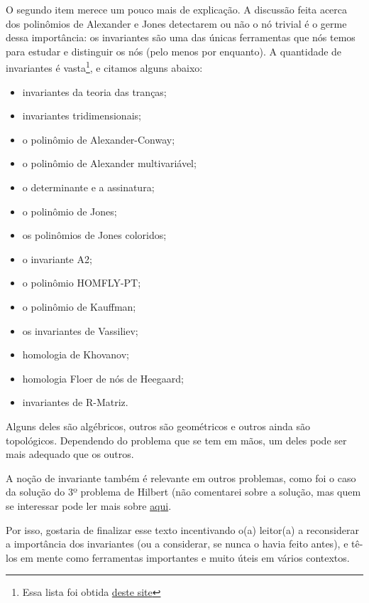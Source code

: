 	    \par\vspace{0.3cm} O segundo item merece um pouco mais de explicação. A discussão feita acerca
	    dos polinômios de Alexander e Jones detectarem ou não o nó trivial é o germe dessa importância:
	    os invariantes são uma das únicas ferramentas que nós temos para estudar e distinguir os nós
	    (pelo menos por enquanto). A quantidade de invariantes é vasta\footnote{Essa lista foi obtida
	    \href{http://katlas.org/wiki/Invariants}{deste site}}, e citamos alguns abaixo:
	    \begin{itemize}
	        \item invariantes da teoria das tranças;
            \item invariantes tridimensionais;
            \item o polinômio de Alexander-Conway;
            \item o polinômio de Alexander multivariável;
            \item o determinante e a assinatura;
            \item o polinômio de Jones;
            \item os polinômios de Jones coloridos;
            \item o invariante A2;
            \item o polinômio HOMFLY-PT;
            \item o polinômio de Kauffman;
            \item os invariantes de Vassiliev;
            \item homologia de Khovanov;
            \item homologia Floer de nós de Heegaard;
            \item invariantes de R-Matriz.
	    \end{itemize}
	    \par\vspace{0.3cm} Alguns deles são algébricos, outros são geométricos e outros ainda são topológicos.
	    Dependendo do problema que se tem em mãos, um deles pode ser mais adequado que os outros.
	    
	    \par\vspace{0.3cm} A noção de invariante também é relevante em outros problemas, como foi o caso
	    da solução do 3º problema de Hilbert (não comentarei sobre a solução, mas quem se interessar pode
	    ler mais sobre \href{https://en.wikipedia.org/wiki/Hilbert\%27s_third_problem}{aqui}.
	    
	    \par\vspace{0.3cm} Por isso, gostaria de finalizar esse texto incentivando o(a) leitor(a) a 
	    reconsiderar a importância dos invariantes (ou a considerar, se nunca o havia feito antes), e
	    tê-los em mente como ferramentas importantes e muito úteis em vários contextos.